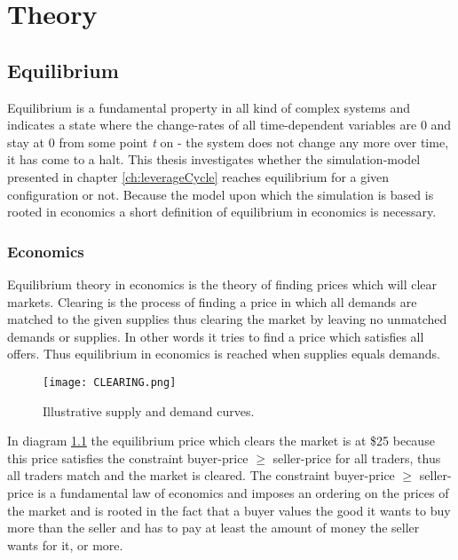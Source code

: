 \documentclass[../Bachelorarbeit.tex]{subfiles}
\begin{document}
\graphicspath{{./figures/theory/}}	%

\chapter{Theory}
\label{ch:theory}

\section{Equilibrium}
Equilibrium is a fundamental property in all kind of complex systems and indicates a state where the change-rates of all time-dependent variables are 0 and stay at 0 from some point \textit{t} on - the system does not change any more over time, it has come to a halt. This thesis investigates whether the simulation-model presented in chapter \ref{ch:leverageCycle} reaches equilibrium for a given configuration or not. Because the model upon which the simulation is based is rooted in economics a short definition of equilibrium in economics is necessary.

\subsection{Economics}
Equilibrium theory in economics is the theory of finding prices which will clear markets. Clearing is the process of finding a price in which all demands are matched to the given supplies thus clearing the market by leaving no unmatched demands or supplies. In other words it tries to find a price which satisfies all offers. Thus equilibrium in economics is reached when supplies equals demands.

\begin{figure}[H]
	\centering
  \texttt{[image: CLEARING.png]}
  	\caption{Illustrative supply and demand curves. \cite{Parsons2006}}
	\label{fig:CLEARING}
\end{figure}

In diagram \ref{fig:CLEARING} the equilibrium price which clears the market is at \$25 because this price satisfies the constraint buyer-price $\geq$ seller-price for all traders, thus all traders match and the market is cleared. The constraint buyer-price $\geq$ seller-price is a fundamental law of economics and imposes an ordering on the prices of the market and is rooted in the fact that a buyer values the good it wants to buy more than the seller and has to pay at least the amount of money the seller wants for it, or more. 
\end{document}
